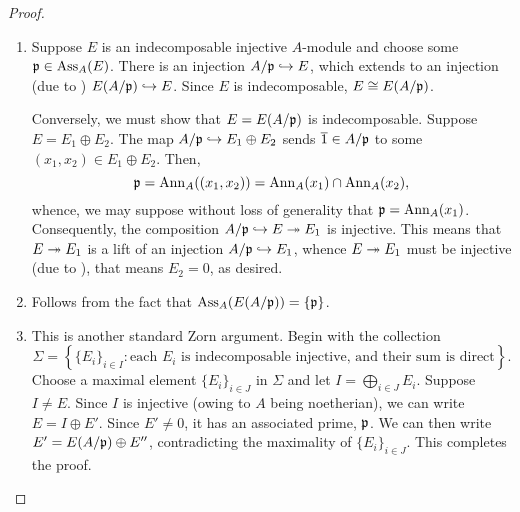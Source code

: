 \begin{proof}
\begin{enumerate}[label=(\alph*)]
    \item Suppose $E$ is an indecomposable injective $A$-module and choose some $\mathfrak{p}\in\operatorname{Ass}_A(E)$. There is an injection $A/\mathfrak{p}\hookrightarrow E$, which extends to an injection (due to ) $E(A/\mathfrak{p})\hookrightarrow E$. Since $E$ is indecomposable, $E\cong E(A/\mathfrak{p})$. 
    
    Conversely, we must show that $E = E(A/\mathfrak{p})$ is indecomposable. Suppose $E = E_1\oplus E_2$. The map $A/\mathfrak{p}\hookrightarrow E_1\oplus E_2$ sends $\overline 1\in A/\mathfrak{p}$ to some $(x_1,x_2)\in E_1\oplus E_2$. Then, 
    \begin{equation*}
        \mathfrak{p} = \operatorname{Ann}_A((x_1, x_2)) = \operatorname{Ann}_A(x_1)\cap\operatorname{Ann}_A(x_2),
    \end{equation*}
    whence, we may suppose without loss of generality that $\mathfrak{p} = \operatorname{Ann}_A(x_1)$.  Consequently, the composition $A/\mathfrak{p}\hookrightarrow E\twoheadrightarrow E_1$ is injective. This means that $E\twoheadrightarrow E_1$ is a lift of an injection $A/\mathfrak{p}\hookrightarrow E_1$, whence $E\twoheadrightarrow E_1$ must be injective (due to ), that means $E_2 = 0$, as desired.

    \item Follows from the fact that $\operatorname{Ass}_A(E(A/\mathfrak{p})) = \{\mathfrak{p}\}$.

    \item This is another standard Zorn argument. Begin with the collection 
    \begin{equation*}
        \Sigma = \left\{\{E_i\}_{i\in I}\colon\text{each $E_i$ is indecomposable injective, and their sum is direct}\right\}.
    \end{equation*}
    Choose a maximal element $\{E_i\}_{i\in J}$ in $\Sigma$ and let $I = \bigoplus_{i\in J} E_i$. Suppose $I\ne E$. Since $I$ is injective (owing to $A$ being noetherian), we can write $E = I\oplus E'$. Since $E'\ne 0$, it has an associated prime, $\mathfrak{p}$. We can then write $E' = E(A/\mathfrak{p})\oplus E''$, contradicting the maximality of $\{E_i\}_{i\in J}$. This completes the proof. \qedhere
\end{enumerate}
\end{proof}